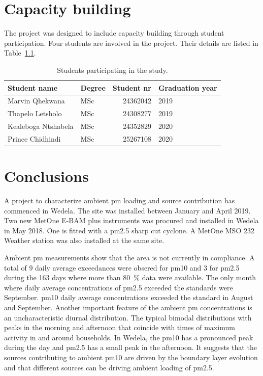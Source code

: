\documentclass{nwureport}
\begin{document}
\chapter{Capacity building}
\label{sec:capacity}

The project was designed to include capacity building through student participation. Four students are involved in the project. Their details are listed in Table~\ref{table:capacity}.

\begin{table}[!htbp]
\label{table:capacity}
\caption{Students participating in the study.}
\begin{center}
  \begin{tabular}{l l r l}
    \toprule
    \bfseries{Student name} & \bfseries{Degree} & \bfseries{Student nr} & \bfseries{Graduation year} \\
    \midrule
    Marvin Qhekwana & MSc & 24362042 & 2019 \\
    Thapelo Letsholo & MSc & 24308277 & 2019 \\
    Kealeboga Ntshabela & MSc & 24352829 & 2020 \\
    Prince Chidhindi & MSc & 25267108 & 2020 \\ 
    \bottomrule
  \end{tabular}
\end{center}
\end{table}
\chapter{Conclusions}
\label{sec:conclusions}

A project to characterize ambient \gls{pm} loading and source contribution has commenced in Wedela. The site was installed between January and April 2019. Two new MetOne E-BAM plus instruments was procured and installed in Wedela in May 2018. One is fitted with a \gls{pm2.5} sharp cut cyclone. A MetOne MSO 232 Weather station was also installed at the same site. 

Ambient \gls{pm} measurements show that the area is not currently in compliance. A total of 9 daily average exceedances were obsered for \gls{pm10} and 3 for \gls{pm2.5} during the 163 days where more than \SI{80}{\percent} data were available. The only month where daily average concentrations of \gls{pm2.5} exceeded the standards were September. \gls{pm10} daily average concentrations exceeded the standard in August and September. Another important feature of the ambient \gls{pm} concentrations is an uncharacteristic diurnal distribution. The typical bimodal distributions with peaks in the morning and afternoon that coincide with times of maximum activity in and around households. In Wedela, the \gls{pm10} has a pronounced peak during the day and \gls{pm2.5} has a small peak in the afternoon. It suggests that the sources contributing to ambient \gls{pm10} are driven by the boundary layer evolution and that different sources can be driving ambient loading of \gls{pm2.5}.
\end{document}
